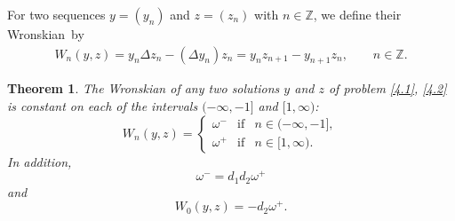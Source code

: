 \documentclass[11pt]{article}
\newtheorem{theorem}{Theorem}
\numberwithin{equation}{section}
\begin{document}
\begin{definition}
\label{Def4.2}For two sequences $y=(y_{n})$ and $z=(z_{n})$ with $n\in
\mathbb{Z}
$, we def\/ine their Wronskian~by%
\begin{gather*}
W_{n}(y,z) = y_{n}\Delta z_{n}-(\Delta y_{n})z_{n}  = y_{n}z_{n+1}-y_{n+1}z_{n},\qquad n\in
\mathbb{Z}
.
\end{gather*}
\end{definition}

\begin{theorem}
\label{Th4.3} The Wronskian of any two solutions $y$ and $z$ of problem \eqref{4.1}, \eqref{4.2} is constant on each of the intervals $(-\infty ,-1]$ and
$[1,\infty )$:
\begin{equation}
W_{n}(y,z)=\left\{
\begin{array}{lll}
\omega ^{-} & \text{if} & n\in (-\infty ,-1], \\
\omega ^{+} & \text{if} & n\in \lbrack 1,\infty ).%
\end{array}%
\right.  \label{4.8}
\end{equation}%
In addition,
\begin{equation}
\omega ^{-}=d_{1}d_{2}\omega ^{+}  \label{4.9}
\end{equation}%
and%
\begin{equation}
W_{0}(y,z)=-d_{2}\omega ^{+}.  \label{4.10}
\end{equation}
\end{theorem}
\end{document}
